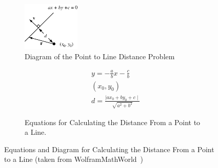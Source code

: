 \begin{figure}[h!]
    \centering

    \begin{subfigure}[b]{\textwidth}
        \centering
        \includegraphics[width=0.3\textwidth]{images/point_to_line.png}
        \caption{Diagram of the Point to Line Distance Problem}
        \label{fig:point_to_line_diagram}
    \end{subfigure}

    \begin{subfigure}[b]{\textwidth}
        \begin{subequations}
            \begin{align}
            & y = -\frac{a}{b}x - \frac{c}{b} \label{eq:line}\\
            & (x_{0}, y_{0}) \label{eq:point} \\
            & d = \frac{\mid ax_{0} + by_{0} + c \mid}{\sqrt{a^{2} + b^{2}}} \label{eq:distance}
            \end{align}
        \end{subequations}
        \caption{Equations for Calculating the Distance From a Point to a Line.}
        \label{fig:point_to_line_equations}
    \end{subfigure}
    \caption{Equations and Diagram for Calculating the Distance From a Point to a Line (taken from WolframMathWorld~\cite{point_to_line})}
    \label{fig:point_to_line_eq}
\end{figure}

